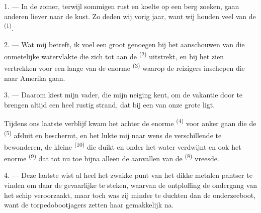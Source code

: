 %

\VUsaut{4.0mm}
\VUsaut{3.0mm}
\VUsaut{3.0mm}

1. --- In de zomer, terwijl sommigen rust en koelte op een berg zoeken, gaan anderen liever
naar de kust. Zo deden wij vorig jaar, want wij houden veel van de 
\textsuperscript{(1)}.

2. --- Wat mij betreft, ik voel een groot genoegen bij het aanschouwen van die onmetelijke
watervlakte die zich tot aan de  \textsuperscript{(2)} uitstrekt, en bij het
zien vertrekken voor een lange
 van de enorme 
\textsuperscript{(3)} waarop de reizigers inschepen die naar Amerika gaan.

3. --- Daarom kiest mijn vader, die mijn neiging kent, om de vakantie door te brengen altijd
een heel rustig strand, dat bij een van onze grote
 ligt.

Tijdens ons laatste verblijf kwam het  achter de enorme
 \textsuperscript{(4)} voor anker gaan die de 
\textsuperscript{(5)} afsluit en beschermt, en het lukte mij naar wens de verschillende
 te bewonderen, de kleine
 \textsuperscript{(10)} die duikt en onder het water
verdwijnt en ook het enorme  \textsuperscript{(9)} dat tot nu toe bijna
alleen de aanvallen van de  \textsuperscript{(8)} vreesde.

\VUsaut{3.0mm}
\VUsaut{3.0mm}

4. --- Deze laatste wist al heel  het zwakke punt van het dikke metalen
pantser te vinden om daar de gevaarlijke  te steken, waarvan de ontploffing de
ondergang van het schip veroorzaakt, maar toch was zij minder te duchten dan de onderzeeboot,
want de torpedobootjagers zetten haar gemakkelijk na.

